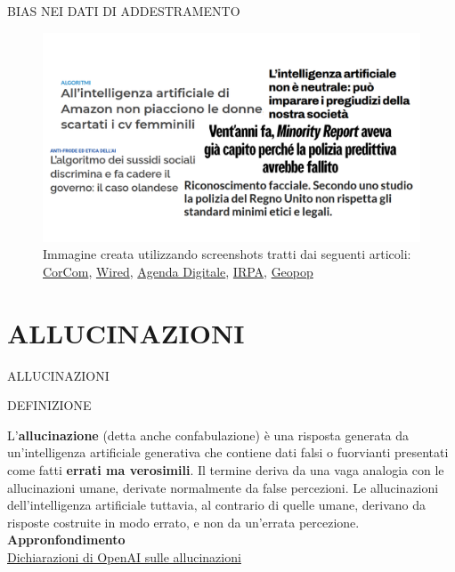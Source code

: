 \documentclass[aspectratio=1610]{beamer}
\begin{document}
\begin{frame}{BIAS NEI DATI DI ADDESTRAMENTO}
    \begin{figure}
        \includegraphics[width=.9\linewidth]{img/bias.png}
        \caption{
            Immagine creata utilizzando screenshots tratti dai seguenti articoli:
            \href{https://www.corrierecomunicazioni.it/over-the-top/allintelligenza-artificiale-di-amazon-non-piacciono-le-donne-scartati-i-cv-femminili/}{CorCom}, 
            \href{https://www.wired.it/article/minority-report-20-anni-analisi/}{Wired}, 
            \href{https://www.agendadigitale.eu/cultura-digitale/algoritmi-troppo-invasivi-contro-le-frodi-fiscali-la-lezione-delle-dimissioni-del-governo-olandese/}{Agenda Digitale}, 
            \href{https://www.irpa.eu/riconoscimento-facciale-secondo-uno-studio-la-polizia-del-regno-unito-non-rispetta-gli-standard-minimi-etici-e-legali/}{IRPA}, 
            \href{https://www.geopop.it/lintelligenza-artificiale-non-e-neutrale-puo-imparare-i-pregiudizi-della-nostra-societa/}{Geopop}
        }
    \end{figure}
\end{frame}

\section{ALLUCINAZIONI}

\begin{frame}{ALLUCINAZIONI}
    \begin{alertblock}{DEFINIZIONE}
        \begin{minipage}{0.96\linewidth}
            \justifying
            L'\textbf{allucinazione} (detta anche confabulazione) è una risposta generata 
            da un'intelligenza artificiale generativa che contiene dati falsi o fuorvianti 
            presentati come fatti \textbf{errati ma verosimili}. Il termine deriva da una vaga 
            analogia con le allucinazioni umane, derivate normalmente da false percezioni. 
            Le allucinazioni dell'intelligenza artificiale tuttavia, al contrario di quelle umane, 
            derivano da risposte costruite in modo errato, e non da un'errata percezione.\\
            \bigskip
            \tiny{\textbf{Appronfondimento}}\\
            \tiny{\href{https://openai.com/it-IT/index/why-language-models-hallucinate/}{Dichiarazioni di OpenAI sulle allucinazioni}}
        \end{minipage}
    \end{alertblock}
\end{frame}
\end{document}
